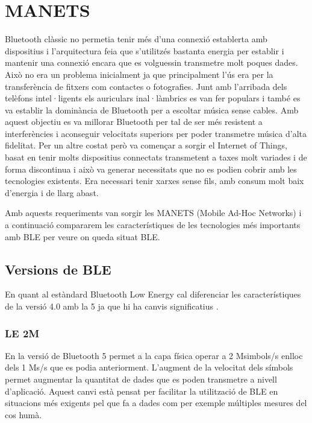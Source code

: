 \section{MANETS}
Bluetooth clàssic no permetia tenir més d'una connexió establerta amb dispositius i l'arquitectura feia que s'utilitzés bastanta energia per establir i mantenir una connexió encara que es volguessin transmetre molt poques dades.
Això no era un problema inicialment ja que principalment l'ús era per la transferència de fitxers com contactes o fotografies.
Junt amb l'arribada dels telèfons intel·ligents els auriculars inal·làmbrics es van fer populars i també es va establir la dominància de Bluetooth per a escoltar música sense cables.
Amb aquest objectiu es va millorar Bluetooth per tal de ser més resistent a interferències i aconseguir velocitats superiors per poder transmetre música d'alta fidelitat.
Per un altre costat però va començar a sorgir el Internet of Things, basat en tenir molts dispositius connectats transmetent a taxes molt variades i de forma discontinua i això va generar necessitats que no es podien cobrir amb les tecnologies existents.
Era necessari tenir xarxes sense fils, amb consum molt baix d'energia i de llarg abast.

Amb aquests requeriments van sorgir les MANETS (Mobile Ad-Hoc Networks) i a continuació compararem les característiques de les tecnologies més importants amb BLE per veure on queda situat BLE.

\subsection{Versions de BLE}
En quant al estàndard Bluetooth Low Energy cal diferenciar les característiques de la versió 4.0 amb la 5 ja que hi ha canvis significatius \cite{BLE_5_improvement_over_4}.

\subsubsection{LE 2M}
En la versió de Bluetooth 5 permet a la capa física operar a 2 Msimbols/s enlloc dels 1 Ms/s que es podia anteriorment. L'augment de la velocitat dels símbols permet augmentar la quantitat de dades que es poden transmetre a nivell d'aplicació.
Aquest canvi està pensat per facilitar la utilització de BLE en situacions més exigents pel que fa a dades com per exemple múltiples mesures del cos humà.

